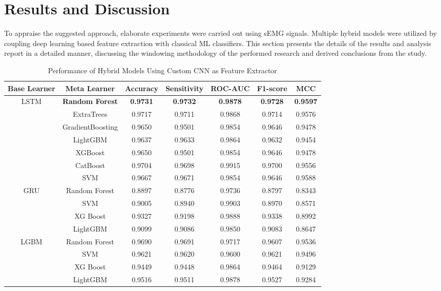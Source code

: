 \documentclass{elektr}
\begin{document}
\section{Results and Discussion}
To appraise the suggested approach, elaborate experiments were carried out using sEMG signals. Multiple hybrid models were utilized by coupling deep learning based feature extraction with classical ML classifiers. This section presents the details of the results and analysis report in a detailed manner, discussing the windowing methodology of the performed research and derived conclusions from the study.

\begin{table}[htbp]
	\centering
	\caption{Performance of Hybrid Models Using Custom CNN as Feature Extractor}
	\label{tab:custom cnn}
	\begin{tabular}{|c|c|c|c|c|c|c|}
		\hline
		\textbf{Base Learner} & \textbf{Meta Learner} & \textbf{Accuracy} & \textbf{Sensitivity} & \textbf{ROC-AUC} & \textbf{F1-score} & \textbf{MCC} \\
		\hline
		\multirow{7}{*}{LSTM} 
		& \textbf{Random Forest} & \textbf{0.9731} & \textbf{0.9732} & \textbf{0.9878} & \textbf{0.9728} & \textbf{0.9597} \\
		& ExtraTrees             & 0.9717 & 0.9711 & 0.9868 & 0.9714 & 0.9576 \\
		& GradientBoosting       & 0.9650 & 0.9501 & 0.9854 & 0.9646 & 0.9478 \\
		& LightGBM               & 0.9637 & 0.9633 & 0.9864 & 0.9632 & 0.9454 \\
		& XGBoost                & 0.9650 & 0.9501 & 0.9854 & 0.9646 & 0.9478 \\
		& CatBoost               & 0.9704 & 0.9698 & 0.9915 & 0.9700 & 0.9556 \\
		& SVM                    & 0.9667 & 0.9671 & 0.9854 & 0.9646 & 0.9588 \\
		\hline
		\multirow{4}{*}{GRU} 
		& Random Forest          & 0.8897 & 0.8776 & 0.9736 & 0.8797 & 0.8343 \\
		& SVM                    & 0.9005 & 0.8940 & 0.9903 & 0.8970 & 0.8571 \\
		& XG Boost               & 0.9327 & 0.9198 & 0.9888 & 0.9338 & 0.8992 \\
		& LightGBM               & 0.9099 & 0.9086 & 0.9850 & 0.9083 & 0.8647 \\
		\hline
		\multirow{4}{*}{LGBM} 
		& Random Forest          & 0.9690 & 0.9691 & 0.9717 & 0.9607 & 0.9536 \\
		& SVM                    & 0.9621 & 0.9620 & 0.9600 & 0.9621 & 0.9496 \\
		& XG Boost               & 0.9449 & 0.9448 & 0.9864 & 0.9464 & 0.9129 \\
		& LightGBM               & 0.9516 & 0.9511 & 0.9878 & 0.9527 & 0.9284 \\
		\hline
	\end{tabular}
\end{table}
\end{document}

